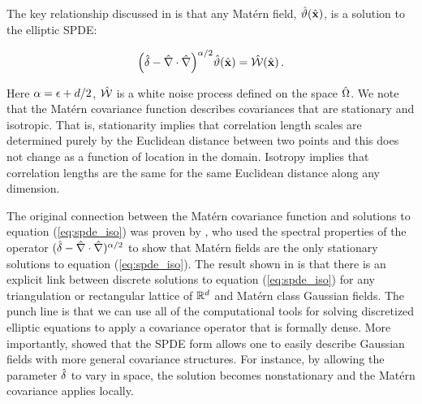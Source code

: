 The key relationship discussed in \citet{RSSB:RSSB777} is that any Mat\'ern field,
$\hat{\vartheta}(\hat{\mathbf{x}})$, is a solution to the elliptic SPDE:
\begin{linenomath*}\begin{equation}
    \Big(\hat{\delta} - \hat{\nabla}\cdot\hat{\nabla}\Big)^{\alpha/2}\hat{\vartheta}(\hat{\mathbf{x}}) =
    \hat{\mathcal{W}}(\hat{\mathbf{x}}) \, .
    \label{eq:spde_iso}
\end{equation}\end{linenomath*}
Here $\alpha = \epsilon + d/2$,
$\hat{\mathcal{W}}$ is a white noise process defined on the space $\hat{\Omega}$.
We note that the Mat\'ern covariance function describes covariances that are
stationary and isotropic.
That is, stationarity implies that correlation length scales are determined
purely by the Euclidean distance between two points and this does not change as
a function of location in the domain.
Isotropy implies that correlation lengths are the same for the same Euclidean
distance along any dimension.

The original connection between the Mat\'ern covariance function and solutions
to equation (\ref{eq:spde_iso}) was proven by
\cite{whittle_stationary_1954,whittle1963stochastic}, who
used the spectral properties of the operator $(\hat{\delta} -
\hat{\nabla}\cdot\hat{\nabla})^{\alpha/2}$ to show that Mat\'ern fields are the only
stationary solutions to equation (\ref{eq:spde_iso}).
The result shown in \citet{RSSB:RSSB777} is
that there is an explicit link between discrete solutions to equation
(\ref{eq:spde_iso}) for any triangulation or rectangular lattice of $\mathbb{R}^{d}$
and Mat\'ern class Gaussian fields.
The punch line is that we can use all of the computational tools for solving discretized
elliptic equations to apply a covariance operator that is formally dense.
More importantly, \citet{RSSB:RSSB777} showed that the SPDE form allows
one to easily describe Gaussian fields with more general covariance structures.
For instance, by allowing the parameter $\hat{\delta}$ to vary in space, the solution
becomes nonstationary and the Mat\'ern covariance applies locally.

